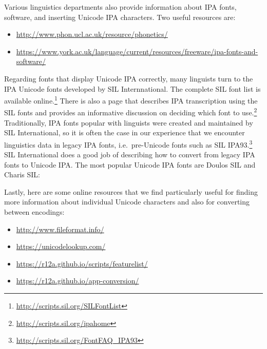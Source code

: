 \noindent Various linguistics departments also provide information about IPA fonts, software, and inserting Unicode IPA characters. Two useful resources are:

\begin{itemize}
	\item \url{http://www.phon.ucl.ac.uk/resource/phonetics/}
	\item \url{https://www.york.ac.uk/language/current/resources/freeware/ipa-fonts-and-software/}
\end{itemize}	

Regarding fonts that display Unicode IPA correctly, many linguists turn to the IPA Unicode fonts developed by SIL Internnational. The complete SIL font list is available online.\footnote{\url{http://scripts.sil.org/SILFontList}} There is also a page that describes IPA transcription using the SIL fonts and provides an informative discussion on deciding which font to use.\footnote{\url{http://scripts.sil.org/ipahome}} Traditionally, IPA fonts popular with linguists were created and maintained by SIL International, so it is often the case in our experience that we encounter linguistics data in legacy IPA fonts, i.e.\ pre-Unicode fonts such as SIL IPA93.\footnote{\url{http://scripts.sil.org/FontFAQ_IPA93}} SIL International does a good job of describing how to convert from legacy IPA fonts to Unicode IPA. The most popular Unicode IPA fonts are Doulos SIL and Charis SIL:

\begin{itemize}
	\item \url{https://software.sil.org/doulos/}}
	\item \url{https://software.sil.org/charis/}
\end{itemize}	

Lastly, here are some online resources that we find particularly useful for finding more information about individual Unicode characters and also for converting between encodings:

\begin{itemize}
	\item \url{http://www.fileformat.info/}
	\item \url{https://unicodelookup.com/}
	\item \url{https://r12a.github.io/scripts/featurelist/}
	\item \url{https://r12a.github.io/app-conversion/}
\end{itemize}


